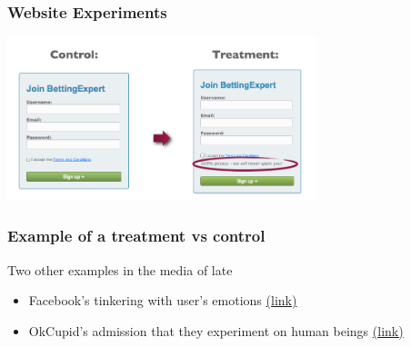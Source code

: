 \documentclass[handout]{beamer}
\newcommand{\blue}[1]{\textcolor{blue2}{#1}}
\begin{document}
\begin{frame}
\frametitle{Website Experiments}
\begin{center}
\includegraphics[width=9cm]{figure/control_treatment.png}
\end{center}
\end{frame}



\begin{frame}
\frametitle{Example of a treatment vs control}
Two other examples in the media of late
\begin{itemize}
\item Facebook's tinkering with user's emotions \blue{\href{http://www.nytimes.com/2014/06/30/technology/facebook-tinkers-with-users-emotions-in-news-feed-experiment-stirring-outcry.html}{(link)}}
\item OkCupid's admission that they experiment on human beings \blue{\href{http://blog.okcupid.com/index.php/we-experiment-on-human-beings/}{(link)}}
\end{itemize}

\end{frame}
\end{document}
